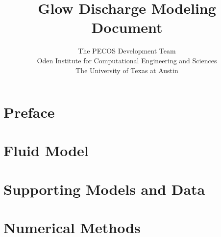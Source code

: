 \documentclass[11pt]{report}
\title{Glow Discharge Modeling Document}
\author{%
  The PECOS Development Team\\
  Oden Institute for Computational Engineering and Sciences\\
  The University of Texas at Austin
}
\date{}
\begin{document}
\maketitle
\tableofcontents

\chapter*{Preface}


\chapter{Fluid Model} \label{sec:fluid}




\chapter{Supporting Models and Data}



\chapter{Numerical Methods}





\end{document}
